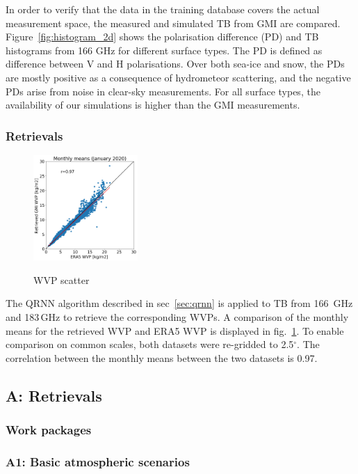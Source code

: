 \documentclass[12pt,oneside,a4paper]{article}
\begin{document}
In order to verify that the data in the training database covers the actual measurement space, the measured and simulated TB from GMI are compared. Figure~\ref{fig:histogram_2d} shows the polarisation difference (PD) and TB histograms from 166 GHz for different surface types. The PD is defined as difference between V and H polarisations. Over both sea-ice and snow, the PDs are mostly positive as a consequence of hydrometeor scattering, and the negative PDs arise from noise in clear-sky measurements. For all surface types, the availability of our simulations is higher than the GMI measurements. 
\subsubsection{Retrievals}

\begin{figure}[t]
	\centering
	\includegraphics[height = 40mm]{Figures/WVP_scatter_monthlymean.png} 
	\label{fig:wvp_scatter}
	\caption{WVP scatter}
\end{figure}

The QRNN algorithm described in sec~\ref{sec:qrnn} is applied to TB from 166 \,GHz and 183\,GHz to retrieve the corresponding WVPs. A comparison of the monthly means for the retrieved WVP and ERA5 WVP is displayed in fig.~\ref{fig:wvp_scatter}. To enable comparison on common scales, both datasets were re-gridded to 2.5$^{\circ}$. The correlation between the monthly means between the two datasets is 0.97. 


\subsection{A: Retrievals}
\subsubsection{Work packages}

\subsubsection*{A1: Basic atmospheric scenarios}
\end{document}
